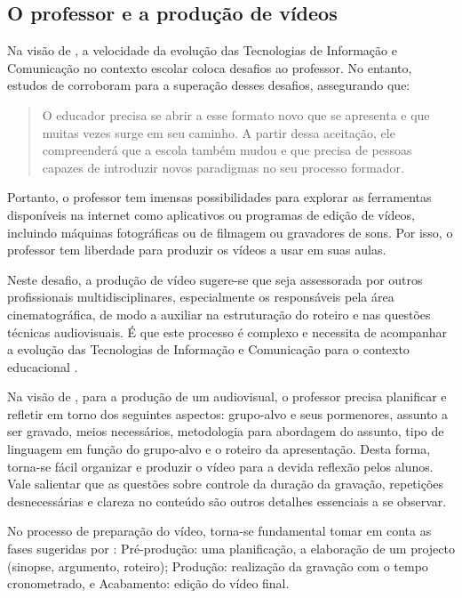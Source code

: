 \documentclass[portuguese]{textolivre}
\begin{document}
\subsection{O professor e a produção de vídeos}
Na visão de \textcite{deckert2010}, a velocidade da evolução das Tecnologias de Informação e Comunicação no contexto escolar coloca desafios ao professor. No entanto, estudos de \textcite[p. 32]{silva2014} corroboram para a superação desses desafios, assegurando que:

\begin{quote}
O educador precisa se abrir a esse formato novo que se apresenta e que muitas vezes surge em seu caminho. A partir dessa aceitação, ele compreenderá que a escola também mudou e que precisa de pessoas capazes de introduzir novos paradigmas no seu processo formador.
\end{quote}

Portanto, o professor tem imensas possibilidades para explorar as ferramentas disponíveis na internet como aplicativos ou programas de edição de vídeos, incluindo máquinas fotográficas ou de filmagem ou gravadores de sons. Por isso, o professor tem liberdade para produzir os vídeos a usar em suas aulas.

Neste desafio, a produção de vídeo sugere-se que seja assessorada por outros profissionais multidisciplinares, especialmente os responsáveis pela área cinematográfica, de modo a auxiliar na estruturação do roteiro e nas questões técnicas audiovisuais. É que este processo é complexo e necessita de acompanhar a evolução das Tecnologias de Informação e Comunicação para o contexto educacional \cite{spanhol2009}.

Na visão de \textcite{deckert2010}, para a produção de um audiovisual, o professor precisa planificar e refletir em torno dos seguintes aspectos: grupo-alvo e seus pormenores, assunto a ser gravado, meios necessários, metodologia para abordagem do assunto, tipo de linguagem em função do grupo-alvo e o roteiro da apresentação. Desta forma, torna-se fácil organizar e produzir o vídeo para a devida reflexão pelos alunos. Vale salientar que as questões sobre controle da duração da gravação, repetições desnecessárias e clareza no conteúdo são outros detalhes essenciais a se observar.

No processo de preparação do vídeo, torna-se fundamental tomar em conta as fases sugeridas por \textcite{deckert2010, carlsson2013}: Pré-produção: uma planificação, a elaboração de um projecto (sinopse, argumento, roteiro); Produção: realização da gravação com o tempo cronometrado, e Acabamento: edição do vídeo final.
\end{document}
